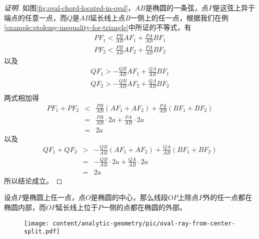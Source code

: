 \begin{proof}[证明]
  如图\ref{fig:oval-chord-located-in-oval}，$AB$是椭圆的一条弦，点$P$是这弦上异于端点的任意一点，而$Q$是$AB$延长线上点$B$一侧上的任一点，根据我们在例\ref{example:ptolemy-inequality-for-triangle}中所证的不等式，有
  \begin{eqnarray*}
   PF_1 < \frac{PB}{AB} AF_1 + \frac{PA}{AB} BF_1 \\
   PF_2 < \frac{PB}{AB} AF_2 + \frac{PA}{AB} BF_2 
  \end{eqnarray*}
  以及
  \begin{eqnarray*}
    QF_1 > - \frac{QB}{AB} AF_1 + \frac{QA}{AB} BF_1 \\
    QF_2 > - \frac{QB}{AB} AF_2 + \frac{QA}{AB} BF_2 \\
  \end{eqnarray*}
  两式相加得
  \begin{eqnarray*}
    PF_1+PF_2 & < & \frac{PB}{AB} (AF_1+AF_2) + \frac{PA}{AB} (BF_1+BF_2) \\
              & = & \frac{PB}{AB} \cdot 2a + \frac{PA}{AB} \cdot 2a \\
    & = & 2a
  \end{eqnarray*}
  以及
  \begin{eqnarray*}
    QF_1+QF_2 & > & -\frac{QB}{AB} (AF_1+AF_2) + \frac{QA}{AB} (BF_1+BF_2) \\
              & = & -\frac{QB}{AB} \cdot 2a + \frac{QA}{AB} \cdot 2a \\
    & = & 2a
  \end{eqnarray*}
  所以结论成立。
\end{proof}

\begin{property}
  设点$P$是椭圆上任一点，点$O$是椭圆的中心，那么线段$OP$上除点$P$外的任一点都在椭圆内部，而$OP$延长线上位于$P$一侧的点都在椭圆的外部。
\end{property}

\begin{figure}[htbp]
  \centering
\texttt{[image: content/analytic-geometry/pic/oval-ray-from-center-split.pdf]}
\caption{}
\label{fig:oval-ray-from-center-split}
\end{figure}

